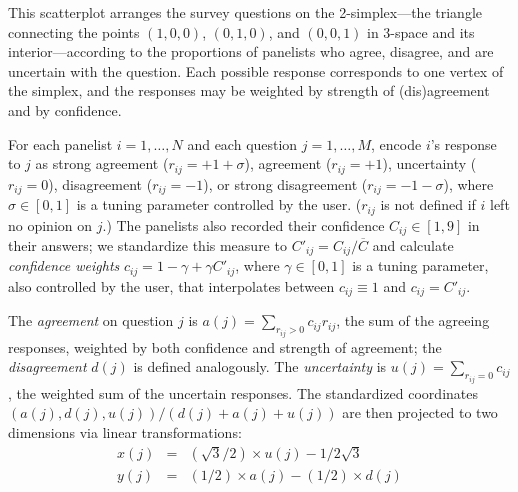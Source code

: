 \documentclass{article}
\begin{document}
This scatterplot arranges the survey questions on the 2-simplex---the triangle connecting the points \((1,0,0)\), \((0,1,0)\), and \((0,0,1)\) in 3-space and its interior---according to the proportions of panelists who agree, disagree, and are uncertain with the question. Each possible response corresponds to one vertex of the simplex, and the responses may be weighted by strength of (dis)agreement and by confidence.

For each panelist \(i=1,\ldots,N\) and each question \(j=1,\ldots,M\), encode \(i\)'s response to \(j\) as strong agreement (\(r_{ij}=+1+\sigma\)), agreement (\(r_{ij}=+1\)), uncertainty (\(r_{ij}=0\)), disagreement (\(r_{ij}=-1\)), or strong disagreement (\(r_{ij}=-1-\sigma\)), where \(\sigma\in[0,1]\) is a tuning parameter controlled by the user. (\(r_{ij}\) is not defined if \(i\) left no opinion on \(j\).) The panelists also recorded their confidence \(C_{ij}\in[1,9]\) in their answers; we standardize this measure to \(C'_{ij}=C_{ij}/\overline{C}\) and calculate {\em confidence weights} \(c_{ij}=1-\gamma+\gamma C'_{ij}\), where \(\gamma\in[0,1]\) is a tuning parameter, also controlled by the user, that interpolates between \(c_{ij}\equiv 1\) and \(c_{ij}=C'_{ij}\).

The {\em agreement} on question \(j\) is \(a(j)=\sum_{r_{ij}>0}{c_{ij}r_{ij}}\), the sum of the agreeing responses, weighted by both confidence and strength of agreement; the {\em disagreement} \(d(j)\) is defined analogously. The {\em uncertainty} is \(u(j)=\sum_{r_{ij}=0}{c_{ij}}\), the weighted sum of the uncertain responses. The standardized coordinates \((a(j),d(j),u(j))/(d(j)+a(j)+u(j))\) are then projected to two dimensions via linear transformations:
\begin{eqnarray*}
x(j) &= &({\sqrt{3}}/{2})\times u(j) - {1}/{2\sqrt{3}} \\
y(j) &= &({1}/{2})\times a(j) - ({1}/{2})\times d(j)
\end{eqnarray*}
\end{document}
